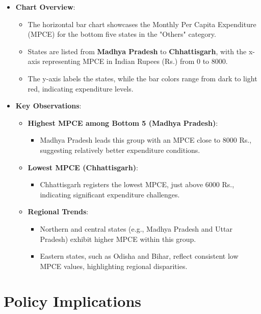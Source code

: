 \documentclass{article}
\begin{document}
\begin{itemize}
	\item \textbf{Chart Overview}:
	\begin{itemize}
		\item The horizontal bar chart showcases the Monthly Per Capita Expenditure (MPCE) for the bottom five states in the "Others" category.
		\item States are listed from \textbf{Madhya Pradesh} to \textbf{Chhattisgarh}, with the x-axis representing MPCE in Indian Rupees (Rs.) from 0 to 8000.
		\item The y-axis labels the states, while the bar colors range from dark to light red, indicating expenditure levels.
	\end{itemize}
	\item \textbf{Key Observations}:
	\begin{itemize}
		\item \textbf{Highest MPCE among Bottom 5 (Madhya Pradesh)}:
		\begin{itemize}
			\item Madhya Pradesh leads this group with an MPCE close to 8000 Rs., suggesting relatively better expenditure conditions.
		\end{itemize}
		\item \textbf{Lowest MPCE (Chhattisgarh)}:
		\begin{itemize}
			\item Chhattisgarh registers the lowest MPCE, just above 6000 Rs., indicating significant expenditure challenges.
		\end{itemize}
		\item \textbf{Regional Trends}:
		\begin{itemize}
			\item Northern and central states (e.g., Madhya Pradesh and Uttar Pradesh) exhibit higher MPCE within this group.
			\item Eastern states, such as Odisha and Bihar, reflect consistent low MPCE values, highlighting regional disparities.
		\end{itemize}
	\end{itemize}
\end{itemize}

\section*{Policy Implications}
\end{document}
